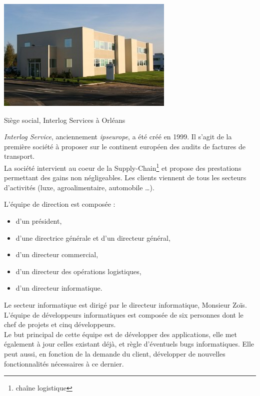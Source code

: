 

\begin{photo}[!h]
	\centering
	\includegraphics[scale=0.5]{../images/siege_interlog.jpg}
	\caption{Siège social, Interlog Services à Orléans}
\end{photo}

\textit{Interlog Service}, anciennement \textit{ipseurope}, a été créé en 1999. Il s'agit de la première société à proposer sur le continent européen des audits de factures de transport.\\

La société intervient au coeur de la \og Supply-Chain\fg \footnote{chaîne logistique}  et propose des prestations permettant des gains non négligeables. Les clients viennent de tous les secteurs d'activités (luxe, agroalimentaire, automobile \ldots).

L'équipe de direction est composée :
\begin{itemize}
\item d'un président,
\item d'une directrice générale et d'un directeur général,
\item d'un directeur commercial,
\item d'un directeur des opérations logistiques,
\item d'un directeur informatique.
\end{itemize}

Le secteur informatique est dirigé par le directeur informatique, Monsieur Zoïs. L'équipe de développeurs informatiques est composée de six personnes dont le chef de projets et  cinq développeurs.\\

Le but principal de cette équipe est de développer des applications, elle  met également à jour celles  existant déjà, et règle d'éventuels bugs informatiques. Elle peut aussi, en fonction de la demande du client,  développer de nouvelles fonctionnalités nécessaires à ce dernier.